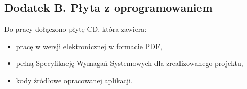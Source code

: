 \begin{flushleft}
\chapter*{Dodatek B. Płyta z oprogramowaniem}
\par
Do pracy dołączono płytę CD, która zawiera:

\begin{itemize}
\item pracę w wersji elektronicznej w formacie PDF,
\item pełną Specyfikację Wymagań Systemowych dla zrealizowanego projektu,
\item kody źródłowe opracowanej aplikacji.
\end{itemize}
\end{flushleft}